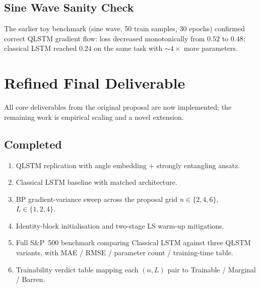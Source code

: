 \documentclass[10pt,twocolumn]{article}
\begin{document}
\subsection*{Sine Wave Sanity Check}

The earlier toy benchmark (sine wave, 50 train samples, 30 epochs) confirmed correct QLSTM gradient flow: loss decreased monotonically from $0.52$ to $0.48$; classical LSTM reached $0.24$ on the same task with $\sim\!4\times$ more parameters.


\section{Refined Final Deliverable}

All core deliverables from the original proposal are now implemented; the remaining work is empirical scaling and a novel extension.

\subsection*{Completed}
\begin{enumerate}
  \item QLSTM replication with angle embedding + strongly entangling ansatz.
  \item Classical LSTM baseline with matched architecture.
  \item BP gradient-variance sweep across the proposal grid $n \in \{2,4,6\}$, $L \in \{1,2,4\}$.
  \item Identity-block initialisation and two-stage LS warm-up mitigations.
  \item Full S\&P~500 benchmark comparing Classical LSTM against three QLSTM variants, with MAE / RMSE / parameter count / training-time table.
  \item Trainability verdict table mapping each $(n, L)$ pair to Trainable / Marginal / Barren.
\end{enumerate}
\end{document}
